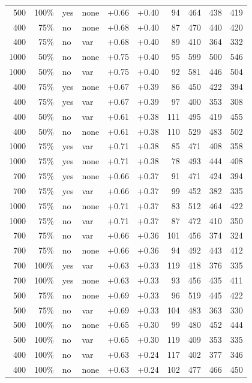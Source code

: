 \begin{table}[!ht]
\begin{tabular}{rrllrrrrrr}
500 & 100\% & yes & none & +0.66 & +0.40 & 94 & 464 & 438 & 419 \\
400 & 75\% & no & none & +0.68 & +0.40 & 87 & 470 & 440 & 420 \\
400 & 75\% & no & var & +0.68 & +0.40 & 89 & 410 & 364 & 332 \\
1000 & 50\% & no & none & +0.75 & +0.40 & 95 & 599 & 500 & 546 \\
1000 & 50\% & no & var & +0.75 & +0.40 & 92 & 581 & 446 & 504 \\
400 & 75\% & yes & none & +0.67 & +0.39 & 86 & 450 & 422 & 394 \\
400 & 75\% & yes & var & +0.67 & +0.39 & 97 & 400 & 353 & 308 \\
400 & 50\% & no & var & +0.61 & +0.38 & 111 & 495 & 419 & 455 \\
400 & 50\% & no & none & +0.61 & +0.38 & 110 & 529 & 483 & 502 \\
1000 & 75\% & yes & var & +0.71 & +0.38 & 85 & 471 & 408 & 358 \\
1000 & 75\% & yes & none & +0.71 & +0.38 & 78 & 493 & 444 & 408 \\
700 & 75\% & yes & none & +0.66 & +0.37 & 91 & 471 & 424 & 394 \\
700 & 75\% & yes & var & +0.66 & +0.37 & 99 & 452 & 382 & 335 \\
1000 & 75\% & no & none & +0.71 & +0.37 & 83 & 512 & 464 & 422 \\
1000 & 75\% & no & var & +0.71 & +0.37 & 87 & 472 & 410 & 350 \\
700 & 75\% & no & var & +0.66 & +0.36 & 101 & 456 & 374 & 324 \\
700 & 75\% & no & none & +0.66 & +0.36 & 94 & 492 & 443 & 412 \\
700 & 100\% & yes & var & +0.63 & +0.33 & 119 & 418 & 376 & 335 \\
700 & 100\% & yes & none & +0.63 & +0.33 & 93 & 456 & 435 & 411 \\
500 & 75\% & no & none & +0.69 & +0.33 & 96 & 519 & 445 & 422 \\
500 & 75\% & no & var & +0.69 & +0.33 & 104 & 483 & 363 & 330 \\
500 & 100\% & no & none & +0.65 & +0.30 & 99 & 480 & 452 & 444 \\
500 & 100\% & no & var & +0.65 & +0.30 & 119 & 409 & 353 & 335 \\
400 & 100\% & no & var & +0.63 & +0.24 & 117 & 402 & 377 & 346 \\
400 & 100\% & no & none & +0.63 & +0.24 & 102 & 477 & 466 & 450 \\

\end{tabular}
\end{table}
